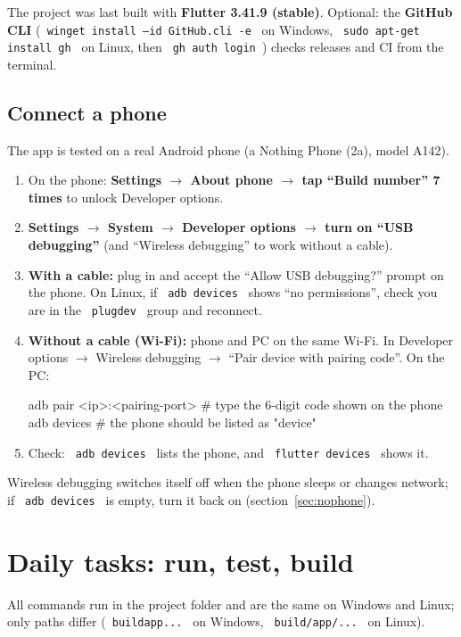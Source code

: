 \documentclass[12pt,a4paper]{article}
\newcommand{\codebs}{\symbol{92}\penalty50\relax}
\newcommand{\code}[1]{\texttt{\let\textbackslash\codebs\XeTeXinterchartokenstate=1 #1\XeTeXinterchartokenstate=0 }}
\begin{document}
The project was last built with \textbf{Flutter 3.41.9 (stable)}. Optional: the \textbf{GitHub CLI} (\code{winget install --id GitHub.cli -e} on Windows, \code{sudo apt-get install gh} on Linux, then \code{gh auth login}) checks releases and CI from the terminal.

\subsection{Connect a phone}\label{sec:phone}

The app is tested on a real Android phone (a Nothing Phone (2a), model A142).
\begin{enumerate}
\item On the phone: \textbf{Settings $\rightarrow$ About phone $\rightarrow$ tap ``Build number'' 7 times} to unlock Developer options.
\item \textbf{Settings $\rightarrow$ System $\rightarrow$ Developer options $\rightarrow$ turn on ``USB debugging''} (and ``Wireless debugging'' to work without a cable).
\item \textbf{With a cable:} plug in and accept the ``Allow USB debugging?'' prompt on the phone. On Linux, if \code{adb devices} shows ``no permissions'', check you are in the \code{plugdev} group and reconnect.
\item \textbf{Without a cable (Wi-Fi):} phone and PC on the same Wi-Fi. In Developer options $\rightarrow$ Wireless debugging $\rightarrow$ ``Pair device with pairing code''. On the PC:
\begin{shell}
adb pair <ip>:<pairing-port>     # type the 6-digit code shown on the phone
adb devices                      # the phone should be listed as "device"
\end{shell}
\item Check: \code{adb devices} lists the phone, and \code{flutter devices} shows it.
\end{enumerate}
Wireless debugging switches itself off when the phone sleeps or changes network; if \code{adb devices} is empty, turn it back on (section~\ref{sec:nophone}).

\section{Daily tasks: run, test, build}

All commands run in the project folder and are the same on Windows and Linux; only paths differ (\code{build\textbackslash{}app\textbackslash{}...} on Windows, \code{build/app/...} on Linux).
\end{document}

